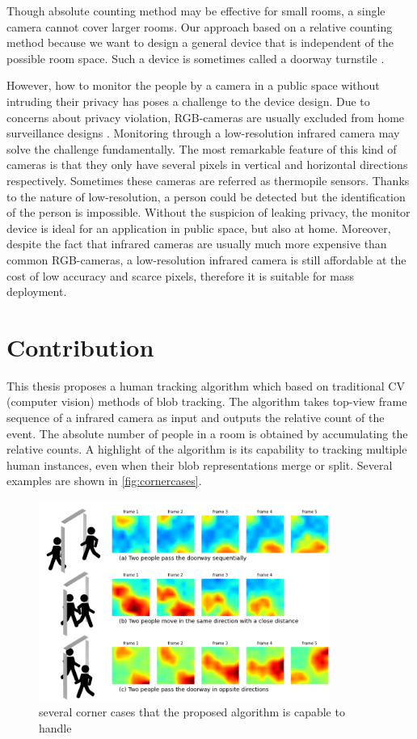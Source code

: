 Though absolute counting method may be effective for small rooms, a single camera cannot cover larger rooms. Our approach based on a relative counting method because we want to design a general device that is independent of the possible room space. Such a device is sometimes called a doorway turnstile \cite{griffiths2017empirical}.

However, how to monitor the people by a camera in a public space without intruding their privacy has poses a challenge to the device design. Due to concerns about privacy violation, RGB-cameras are usually excluded from home surveillance designs \cite{privacyconcerns}. Monitoring through a low-resolution infrared camera may solve the challenge fundamentally. The most remarkable feature of this kind of cameras is that they only have several pixels in vertical and horizontal directions respectively. Sometimes these cameras are referred as thermopile sensors. Thanks to the nature of low-resolution, a person could be detected but the identification of the person is impossible. Without the suspicion of leaking privacy, the monitor device is ideal for an application in public space, but also at home. Moreover, despite the fact that infrared cameras are usually much more expensive than common RGB-cameras, a low-resolution infrared camera is still affordable at the cost of low accuracy and scarce pixels, therefore it is suitable for mass deployment.
\section{Contribution}
This thesis proposes a human tracking algorithm which based on traditional CV (computer vision) methods of blob tracking. The algorithm takes top-view frame sequence of a infrared camera as input and outputs the relative count of the event. The absolute number of people in a room is obtained by accumulating the relative counts. A highlight of the algorithm is its capability to tracking multiple human instances, even when their blob representations merge or split. Several examples are shown in \autoref{fig:cornercases}.
\begin{figure}
  \centering
  \includegraphics[width=0.85\textwidth]{figures/cornercases.PNG}
  \caption{several corner cases that the proposed algorithm is capable to handle}\label{fig:cornercases}
\end{figure}

